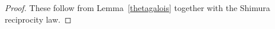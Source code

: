 \documentclass[11pt, reqno]{amsart}
\theoremstyle{plain}
\newtheorem{lemma}[theorem]{Lemma}
\theoremstyle{definition}
\numberwithin{equation}{section}
\begin{document}
\begin{proof}
These follow from Lemma~\ref{thetagalois} together with the Shimura reciprocity law.

\end{proof}






  

\end{document}
